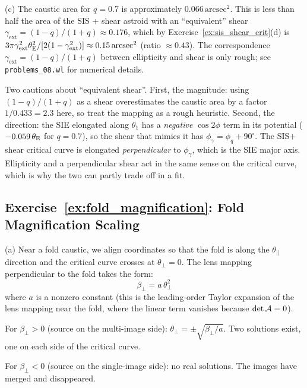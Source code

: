 (c) The caustic area for $q = 0.7$ is approximately
$0.066\,\mathrm{arcsec}^2$.  This is less than half the area of the
SIS + shear astroid with an ``equivalent'' shear
$\gamma_{\mathrm{ext}} = (1-q)/(1+q) \approx 0.176$, which by
Exercise~\ref{ex:sis_shear_crit}(d) is
$3\pi\gamma_{\mathrm{ext}}^2\theta_{\mathrm{E}}^2/[2(1-\gamma_{\mathrm{ext}}^2)]
\approx 0.15\,\mathrm{arcsec}^2$ (ratio $\approx 0.43$).  The
correspondence $\gamma_{\mathrm{ext}} = (1-q)/(1+q)$ between ellipticity
and shear is only rough; see \texttt{problems\_08.wl} for numerical
details.

\begin{annotation}
Two cautions about ``equivalent shear''.  First, the magnitude:
using $(1-q)/(1+q)$ as a shear overestimates the caustic area by a factor
$1/0.433 = 2.3$ here, so treat the mapping as a rough heuristic.
Second, the direction: the
SIE elongated along $\theta_1$ has a \emph{negative} $\cos2\phi$ term in its
potential ($-0.059\,\theta_{\mathrm{E}}$ for $q = 0.7$), so the shear that mimics it has
$\phi_\gamma = \phi_q + 90^\circ$.  The SIS$+$shear critical curve is
elongated \emph{perpendicular} to $\phi_\gamma$, which is the SIE major axis.
Ellipticity and a perpendicular shear act in the same sense on the critical
curve, which is why the two can partly trade off in a fit.
\end{annotation}


\subsection*{Exercise~\ref{ex:fold_magnification}: Fold Magnification Scaling}

(a) Near a fold caustic, we align coordinates so that the
fold is along the $\theta_\parallel$ direction and the critical
curve crosses at $\theta_\perp = 0$.  The lens mapping perpendicular
to the fold takes the form:
\begin{equation*}
    \beta_\perp = a\,\theta_\perp^2
\end{equation*}
where $a$ is a nonzero constant (this is the leading-order Taylor
expansion of the lens mapping near the fold, where the linear term
vanishes because $\det\mathcal{A} = 0$).

For $\beta_\perp > 0$ (source on the multi-image side):
$\theta_\perp = \pm\sqrt{\beta_\perp/a}$.  Two solutions exist, one
on each side of the critical curve.

For $\beta_\perp < 0$ (source on the single-image side): no real
solutions.  The images have merged and disappeared. \checkmark

